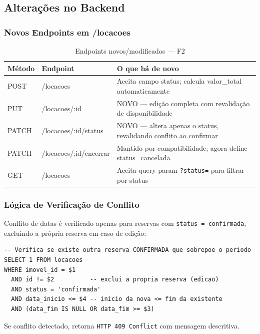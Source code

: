\documentclass[12pt, a4paper]{article}
\newcommand{\thead}[1]{\cellcolor{tableheader}\color{white}\bfseries #1}
\newcommand{\talt}{\rowcolor{tablerowalt}}
\begin{document}
\subsection{Alterações no Backend}

\subsubsection{Novos Endpoints em /locacoes}

\begin{table}[H]
\centering
\begin{tabularx}{\textwidth}{|l|l|X|}
\hline
\thead{Método} & \thead{Endpoint} & \thead{O que há de novo} \\
\hline
POST  & /locacoes              & Aceita campo status; calcula valor\_total automaticamente \\
\talt PUT   & /locacoes/:id          & NOVO — edição completa com revalidação de disponibilidade \\
PATCH & /locacoes/:id/status   & NOVO — altera apenas o status, revalidando conflito ao confirmar \\
\talt PATCH & /locacoes/:id/encerrar & Mantido por compatibilidade; agora define status=cancelada \\
GET   & /locacoes              & Aceita query param \texttt{?status=} para filtrar por status \\
\hline
\end{tabularx}
\caption{Endpoints novos/modificados — F2}
\end{table}

\subsubsection{Lógica de Verificação de Conflito}

Conflito de datas é verificado apenas para reservas com \texttt{status = confirmada}, excluindo a própria reserva em caso de edição:

\begin{lstlisting}[language=SQL2]
-- Verifica se existe outra reserva CONFIRMADA que sobrepoe o periodo
SELECT 1 FROM locacoes
WHERE imovel_id = $1
  AND id != $2          -- exclui a propria reserva (edicao)
  AND status = 'confirmada'
  AND data_inicio <= $4 -- inicio da nova <= fim da existente
  AND (data_fim IS NULL OR data_fim >= $3)
\end{lstlisting}

Se conflito detectado, retorna \texttt{HTTP 409 Conflict} com mensagem descritiva.
\end{document}
